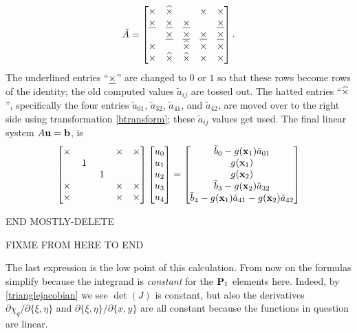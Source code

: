 \begin{example}
\begin{equation*}
\tilde A = \begin{bmatrix}
\times  & \widehat{\times} &     & \times  & \times \\
\underline{\times} & \underline{\times} & \underline{\times} &     & \underline{\times} \\
    & \underline{\times} & \underline{\times} & \underline{\times} & \underline{\times} \\
\times  &     & \widehat{\times} & \times  & \times \\
\times  & \widehat{\times} & \widehat{\times} & \times  & \times
\end{bmatrix}.
\end{equation*}
The underlined entries ``$\underline{\times}$'' are changed to $0$ or $1$ so that these rows become rows of the identity; the old computed values $\tilde a_{ij}$ are tossed out.  The hatted entries ``$\widehat{\times}$'', specifically the four entries $\tilde a_{01}$, $\tilde a_{32}$, $\tilde a_{41}$, and $\tilde a_{42}$, are moved over to the right side using transformation \eqref{btransform}; these $\tilde a_{ij}$ values get used.  The final linear system $A \mathbf{u} = \mathbf{b}$, is
\begin{equation*}
\begin{bmatrix}
\times & & & \times & \times \\
 & \,1\, & & & \\
 & & \,1\, & & \\
\times & & & \times & \times \\
\times & & & \times & \times
\end{bmatrix}
\begin{bmatrix}
u_0 \\
u_1 \\
u_2 \\
u_3 \\
u_4
\end{bmatrix}
=
\begin{bmatrix}
\tilde b_0 - g(\mathbf{x}_1) \tilde a_{01} \\
g(\mathbf{x}_1) \\
g(\mathbf{x}_2) \\
\tilde b_3 - g(\mathbf{x}_2) \tilde a_{32} \\
\tilde b_4 - g(\mathbf{x}_1) \tilde a_{41} - g(\mathbf{x}_2) \tilde a_{42}
\end{bmatrix}
\end{equation*}
\end{example}
\noindent\hrulefill

\bigskip

END MOSTLY-DELETE

FIXME FROM HERE TO END

The last expression is the low point of this calculation.  From now on the formulas simplify because the integrand is \emph{constant} for the $\mathbf{P}_1$ elements here.  Indeed, by \eqref{trianglejacobian} we see $\det(J)$ is constant, but also the derivatives $\partial \chi_q/\partial\{\xi,\eta\}$ and $\partial\{\xi,\eta\}/\partial\{x,y\}$ are all constant because the functions in question are linear.

